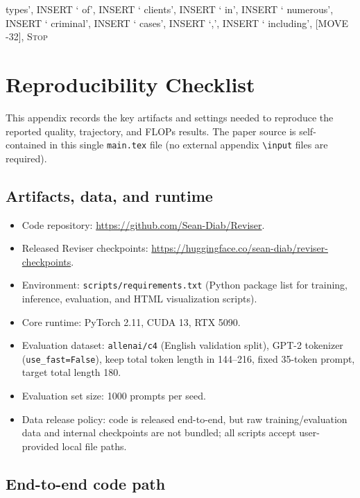 \documentclass[11pt]{article}
\DeclareRobustCommand{\Stop}{\ifmmode\text{\textsc{Stop}}\else\textsc{Stop}\fi}
\begin{document}
{types', INSERT ` of', INSERT ` clients', INSERT ` in', INSERT ` numerous', INSERT ` criminal', INSERT ` cases', INSERT `,', INSERT ` including', [MOVE -32], \Stop\par
}
\vspace{0.8em}

\section{Reproducibility Checklist}
\label{sec:repro}

This appendix records the key artifacts and settings needed to reproduce the reported quality, trajectory, and FLOPs results. The paper source is self-contained in this single \texttt{main.tex} file (no external appendix \texttt{\textbackslash input} files are required).

\subsection{Artifacts, data, and runtime}
\label{sec:repro_artifacts}

\begin{itemize}[leftmargin=*,itemsep=0.2em]
\item Code repository: \url{https://github.com/Sean-Diab/Reviser}.
\item Released Reviser checkpoints: \url{https://huggingface.co/sean-diab/reviser-checkpoints}.
\item Environment: \texttt{scripts/requirements.txt} (Python package list for training, inference, evaluation, and HTML visualization scripts).
\item Core runtime: PyTorch 2.11, CUDA 13, RTX 5090.
\item Evaluation dataset: \texttt{allenai/c4} (English validation split), GPT-2 tokenizer (\texttt{use\_fast=False}), keep total token length in \numrange{144}{216}, fixed 35-token prompt, target total length 180.
\item Evaluation set size: 1000 prompts per seed.
\item Data release policy: code is released end-to-end, but raw training/evaluation data and internal checkpoints are not bundled; all scripts accept user-provided local file paths.
\end{itemize}

\subsection{End-to-end code path}
\label{sec:repro_codepath}
\end{document}
